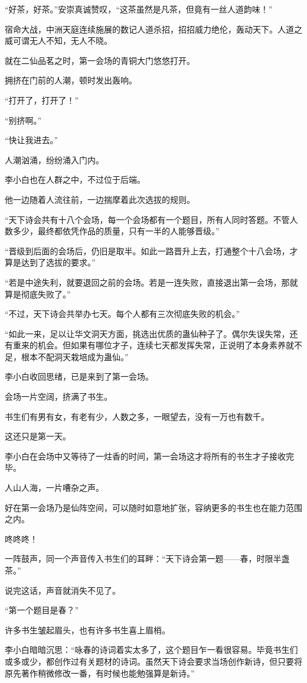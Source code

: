 \begin{this_body}
“好茶，好茶。”安崇真诚赞叹，“这茶虽然是凡茶，但竟有一丝人道韵味！”

宿命大战，中洲天庭连续施展的数记人道杀招，招招威力绝伦，轰动天下。人道之威可谓无人不知，无人不晓。

就在二仙品茗之时，第一会场的青铜大门悠悠打开。

拥挤在门前的人潮，顿时发出轰响。

“打开了，打开了！”

“别挤啊。”

“快让我进去。”

人潮汹涌，纷纷涌入门内。

李小白也在人群之中，不过位于后端。

他一边随着人流往前，一边揣摩着此次选拔的规则。

“天下诗会共有十八个会场，每一个会场都有一个题目，所有人同时答题。不管人数多少，最终都依凭作品的质量，只有一半的人能够晋级。”

“晋级到后面的会场后，仍旧是取半。如此一路晋升上去，打通整个十八会场，才算是达到了选拔的要求。”

“若是中途失利，就要退回之前的会场。若是一连失败，直接退出第一会场，那就算是彻底失败了。”

“不过，天下诗会共举办七天。每个人都有三次彻底失败的机会。”

“如此一来，足以让华文洞天方面，挑选出优质的蛊仙种子了。偶尔失误失常，还有重来的机会。但如果有哪位才子，连续七天都发挥失常，正说明了本身素养就不足，根本不配洞天栽培成为蛊仙。”

李小白收回思绪，已是来到了第一会场。

会场一片空阔，挤满了书生。

书生们有男有女，有老有少，人数之多，一眼望去，没有一万也有数千。

这还只是第一天。

李小白在会场中又等待了一炷香的时间，第一会场这才将所有的书生才子接收完毕。

人山人海，一片嘈杂之声。

好在第一会场乃是仙阵空间，可以随时如意地扩张，容纳更多的书生也在能力范围之内。

咚咚咚！

一阵鼓声，同一个声音传入书生们的耳畔：“天下诗会第一题——春，时限半盏茶。”

说完这话，声音就消失不见了。

“第一个题目是春？”

许多书生皱起眉头，也有许多书生喜上眉梢。

李小白暗暗沉思：“咏春的诗词着实太多了，这个题目乍一看很容易。毕竟书生们或多或少，都创作过有关题材的诗词。虽然天下诗会要求当场创作新诗，但只要将原先著作稍微修改一番，有时候也能勉强算是新诗。”


\end{this_body}
